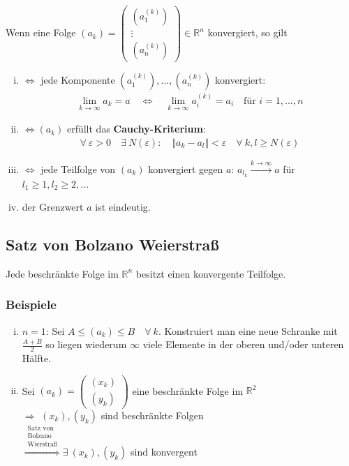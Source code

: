 \documentclass[11pt,a4paper]{book}
\newcommand {\R}	{\mathbb{R}}
\newcommand {\Rn}	{\mathbb{R}^n}
\newcommand{\1}    	{\mathbbm{1}}
\begin{document}
Wenn eine Folge \((a_k) = \left( \begin{array}{c} \left( a_1^{(k)} \right) \\ \vdots \\ \left( a_n^{(k)} \right)	\end{array} \right) \in \Rn\) konvergiert, so gilt
\begin{enumerate}[(i)]
	\item  \(\Leftrightarrow\) jede Komponente \( \left( a_1^{(k)}\right), ..., \left( a_n^{(k)} \right) \) konvergiert:
	\begin{align*}
		\lim_{k \rightarrow \infty} a_k = a \quad \Leftrightarrow \quad \lim_{k \rightarrow \infty} a_i^{(k)} = a_i \quad \textrm{für } i = 1, ..., n
	\end{align*}
	\item \(\Leftrightarrow (a_k) \) erfüllt das \textbf{Cauchy-Kriterium}:
	\begin{align*}
		\forall~ \varepsilon > 0 \quad \exists~ N(\varepsilon) : \quad \Vert a_k - a_l \Vert < \varepsilon \quad \forall~ k,l \geqslant N(\varepsilon)
	\end{align*}
	\item \(\Leftrightarrow\) jede Teilfolge von \((a_k)\) konvergiert gegen \(a\): \( a_{l_k} \stackrel{k \rightarrow \infty}{\rightarrow} a \) für \( l_1 \geqslant 1, l_2 \geqslant 2, ...\)
	\item der Grenzwert \(a\) ist eindeutig.
\end{enumerate}

\subsection{Satz von Bolzano Weierstraß}
Jede beschränkte Folge im \(\Rn\) besitzt einen konvergente Teilfolge.

\subsubsection*{Beispiele}
\begin{enumerate}[(i)]
	\item \(n = 1\): Sei \( A \leqslant (a_k) \leqslant B \quad \forall~ k \). Konstruiert man eine neue Schranke mit \(\frac{A + B}{2} \) so liegen wiederum \(\infty\) viele Elemente in der oberen und/oder unteren Hälfte.
	\item Sei \((a_k) = \left( \begin{array}{c} (x_k) \\ (y_k) \end{array} \right) \) eine beschränkte Folge im \(\R^2\) \\
\(\Rightarrow\) \((x_k), (y_k)\) sind beschränkte Folgen \\
\(\stackrel{\substack{\textrm{Satz von}\\\textrm{Bolzano}\\\textrm{Wierstraß}}}{\Rightarrow} \exists~ (x_k), (y_k)\) sind konvergent
\end{enumerate}
\end{document}
